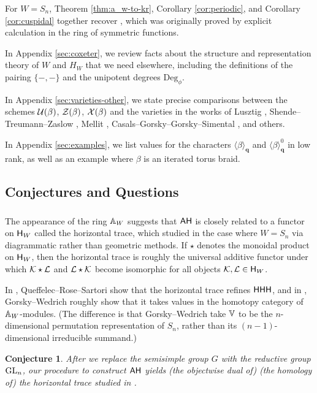 \documentclass[a4paper,10pt,leqno]{amsart}
\theoremstyle{plain}
\theoremstyle{plain}
\theoremstyle{plain}
\newtheorem{conj}[mainthm]{Conjecture}
\theoremstyle{definition}
\theoremstyle{remark}
\newcommand{\Q}{\bm{q}}
\newcommand{\UDeg}{\mathrm{Deg}}
\newcommand{\Tr}[1]{\langle{#1}\rangle_{\Q}}
\begin{document}
For $W = S_n$, Theorem \ref{thm:a_w-to-kr}, Corollary \ref{cor:periodic}, and Corollary \ref{cor:cuspidal} together recover \cite[Thm.\ 1.1]{gors}, which was originally proved by explicit calculation in the ring of symmetric functions.

In Appendix \ref{sec:coxeter}, we review facts about the structure and representation theory of $W$ and $H_W$ that we need elsewhere, including the definitions of the pairing $\{-, -\}$ and the unipotent degrees $\UDeg_\phi$.

In Appendix \ref{sec:varieties-other}, we state precise comparisons between the schemes $\cal{U}(\beta)$, $\cal{Z}(\beta)$, $\cal{X}(\beta)$ and the varieties in the works of Lusztig \cite{lusztig_2011}, Shende--Treumann--Zaslow \cite{stz}, Mellit \cite{mellit}, Casals--Gorsky--Gorsky--Simental \cite{cggs}, and others.

In Appendix \ref{sec:examples}, we list values for the characters $\Tr{\beta}$ and $\Tr{\beta}^0$ in low rank, as well as an example where $\beta$ is an iterated torus braid.

\subsection{Conjectures and Questions}

\subsubsection{}

The appearance of the ring $\bb{A}_W$ suggests that $\sf{AH}$ is closely related to a functor on $\sf{H}_W$ called the horizontal trace, which \cite{qrs, gw, ghw} studied in the case where $W = S_n$ via diagrammatic rather than geometric methods.
If $\star$ denotes the monoidal product on $\sf{H}_W$, then the horizontal trace is roughly the universal additive functor under which $\cal{K} \star \cal{L}$ and $\cal{L} \star \cal{K}$ become isomorphic for all objects $\cal{K}, \cal{L} \in \sf{H}_W$.

In \cite{qrs}, Queffelec--Rose--Sartori show that the horizontal trace refines $\sf{HHH}$, and in \cite{gw}, Gorsky--Wedrich roughly show that it takes values in the homotopy category of $\bb{A}_W$-modules.
(The difference is that Gorsky--Wedrich take $\bb{V}$ to be the $n$-dimensional permutation representation of $S_n$, rather than its $(n - 1)$-dimensional irreducible summand.)

\begin{conj}
After we replace the semisimple group $G$ with the reductive group $\ur{GL}_n$, our procedure to construct $\sf{AH}$ yields (the objectwise dual of) (the homology of) the horizontal trace studied in \cite{gw}.
\end{conj}
\end{document}
